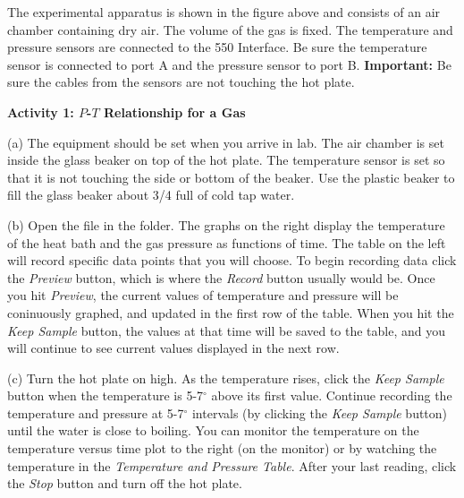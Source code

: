 The experimental apparatus is shown in the figure above and consists
of an air chamber containing dry air. The volume of the gas is fixed. 
The temperature and pressure sensors are connected to the 550 Interface. 
Be sure the temperature sensor is connected to port A and the pressure sensor 
to port B. \textbf{Important:} Be sure the cables from the sensors are not touching the hot 
plate.

\bigskip

\pagebreak[2]
\textbf{Activity 1: $P$-$T$ Relationship for a Gas}


(a) The equipment should be set when you arrive in lab. The air chamber is set 
inside the glass beaker on top of the hot plate. The temperature sensor is set 
so that it is not touching the side or bottom of the beaker. Use the plastic 
beaker to fill the glass beaker about 3/4 full of cold tap water.

(b) Open the file  in the \filename{\coursefolder} folder.
The graphs on the right display the temperature of the heat bath and the gas pressure as functions of time.  
The table on the left will record specific data points that you will choose.  
To begin recording data click
the \textit{Preview} button, which is where the \textit{Record} button usually would be. 
Once you hit \textit{Preview}, the current values of temperature and pressure will be coninuously graphed, and updated in the first row of the table.  When you hit the \textit{Keep Sample} button, the values at that time will be saved to the table, and you will continue to see current values displayed in the next row.


(c) Turn the hot plate on high.  As the temperature rises, click the \textit{Keep Sample} button when the temperature is 5-7\( ^{\circ } \) above its first value.  Continue recording the temperature and pressure at 5-7\( ^{\circ } \) intervals (by clicking the \textit{Keep Sample} button) until the water is close to boiling.  You can monitor the temperature on the temperature versus time plot to the right (on the monitor) or by watching the temperature in the \textit{Temperature and Pressure Table}.  After your last reading, click the \textit{Stop} button and turn off the hot plate.

